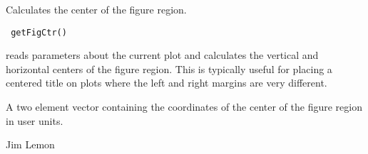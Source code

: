 \begin{Description}\relax
Calculates the center of the figure region.
\end{Description}
\begin{Usage}
\begin{verbatim}
 getFigCtr()
\end{verbatim}
\end{Usage}
\begin{Details}\relax
{} reads parameters about the current plot and calculates the
vertical and horizontal centers of the figure region. This is typically useful
for placing a centered title on plots where the left and right margins are very
different.
\end{Details}
\begin{Value}
A two element vector containing the coordinates of the center of the
figure region in user units.
\end{Value}
\begin{Author}\relax
Jim Lemon
\end{Author}

